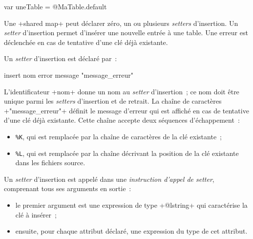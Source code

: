 \begin{galgas}
var uneTable = @MaTable.default
\end{galgas}

 

%
%








Une \ggs+shared map+ peut déclarer zéro, un ou plusieurs \emph{setters} d'insertion. Un \emph{setter} d'insertion permet d'insérer une nouvelle entrée à une table. Une erreur est déclenchée en cas de tentative d'une clé déjà existante.


Un \emph{setter} d'insertion est déclaré par~:

\begin{galgas}
insert nom error message "message_erreur"
\end{galgas}

L'identificateur \ggs+nom+ donne un nom au \emph{setter} d'insertion~; ce nom doit être unique parmi les \emph{setters} d'insertion et de retrait. La chaîne de caractères \ggs+"message_erreur"+ définit le message d'erreur qui est affiché en cas de tentative d'une clé déjà existante. Cette chaîne accepte deux séquences d'échappement~:
\begin{itemize}
  \item \texttt{\%K}, qui est remplacée par la chaîne de caractères de la clé existante~;
  \item \texttt{\%L}, qui est remplacée par la chaîne décrivant la position de la clé existante dans les fichiers source.
\end{itemize}


Un \emph{setter} d'insertion est appelé dans une \emph{instruction d'appel de setter}, comprenant tous ses arguments en sortie~:
\begin{itemize}
  \item le premier argument est une expression de type \ggs+@lstring+ qui caractérise la clé à insérer~;
  \item ensuite, pour chaque attribut déclaré, une expression du type de cet attribut.
\end{itemize}

